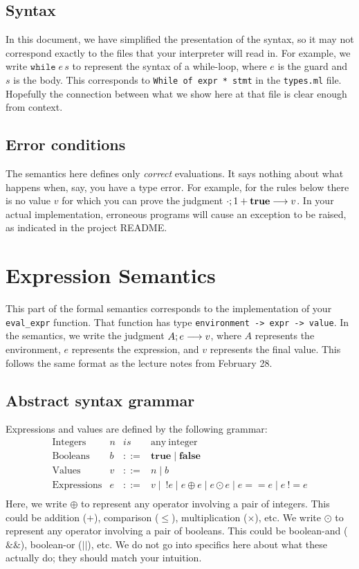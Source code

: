 \documentclass[10pt]{article}
\begin{document}
\subsection{Syntax}

In this document, we have simplified the presentation of the syntax,
so it may not correspond exactly to the files that your interpreter
will read in. For example, we write $\mathtt{while}\;e\,s$ to
represent the syntax of a while-loop, where $e$ is the guard and $s$
is the body. This corresponds to \texttt{While of expr * stmt} in the
\texttt{types.ml} file. Hopefully the connection between what we show
here at that file is clear enough from context.

\subsection{Error conditions}

The semantics here defines only \emph{correct} evaluations. It says
nothing about what happens when, say, you have a type error. For
example, for the rules below there is no value $v$ for which you can
prove the judgment $\config[\cdot]{1+\mathbf{true}} --> v$. In your actual
implementation, erroneous programs will cause an exception to be
raised, as indicated in the project README.

\section{Expression Semantics}

This part of the formal semantics corresponds to the implementation of
your \texttt{eval\_expr} function. That function has type
\texttt{environment -> expr -> value}. In the semantics, we write the
judgment $\config{e} --> v$, where $A$ represents the environment, $e$
represents the expression, and $v$ represents the final value. This
follows the same format as the lecture notes from February 28.

\subsection{Abstract syntax grammar}

Expressions and values are defined by the following grammar:
\[
\begin{array}{lrcl}
\mathrm{Integers} & n & \mathit{is} & \mathrm{any\ integer}\\
\mathrm{Booleans} & b & \mathtt{::=} & \mathbf{true} \mid \mathbf{false} \\
\mathrm{Values} & v & \mathtt{::=} & n \mid b \\
\mathrm{Expressions} & e & \mathtt{::=} & v \mid\ !e \mid e \oplus e \mid e \odot e \mid e == e \mid
                   e\ != e \\
\end{array}
\]
Here, we write $\oplus$ to represent any operator involving a pair of
integers. This could be addition ($+$), comparison ($\leq$),
multiplication ($\times$), etc. We write $\odot$ to represent any
operator involving a pair of booleans. This could be boolean-and
($\&\&$), boolean-or ($||$), etc. We do not go into specifics here
about what these actually do; they should match your
intuition.
\end{document}
